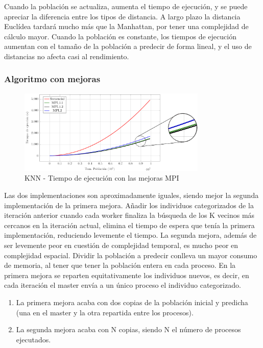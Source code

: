 			Cuando la población se actualiza, aumenta el tiempo de ejecución, y se puede apreciar la diferencia entre los tipos de distancia. A largo plazo la distancia Euclídea tardará mucho más que la Manhattan, por tener una complejidad de cálculo mayor. 
			Cuando la población es constante, los tiempos de ejecución aumentan con el tamaño de la población a predecir de forma lineal, y el uso de distancias no afecta casi al rendimiento.
		
		\subsubsection{Algoritmo con mejoras}


			\begin{figure}[!h]
				\centering
				\includegraphics[width=0.8\textwidth]{images/chapter_4/knn_mpi}
				\caption{KNN - Tiempo de ejecución con las mejoras MPI}
				\label{fig:example}
			\end{figure}
			
			Las dos implementaciones son aproximadamente iguales, siendo mejor la segunda implementación de la primera mejora. Añadir los individuos categorizados de la iteración anterior cuando cada worker finaliza la búsqueda de los K vecinos más cercanos en la iteración actual, elimina el tiempo de espera que tenía la primera implementación, reduciendo levemente el tiempo.
			La segunda mejora, además de ser levemente peor en cuestión de complejidad temporal, es mucho peor en complejidad espacial. Dividir la población a predecir conlleva un mayor consumo de memoria, al tener que tener la población entera en cada proceso. En la primera mejora se reparten equitativamente los individuos nuevos, es decir, en cada iteración el master envía a un único proceso el individuo categorizado.
			
			
			\begin{enumerate}
				\item La primera mejora acaba con dos copias de la población inicial y predicha (una en el master y la otra repartida entre los procesos).
				\item La segunda mejora acaba con N copias, siendo N el número de procesos ejecutados.
			\end{enumerate}
		

